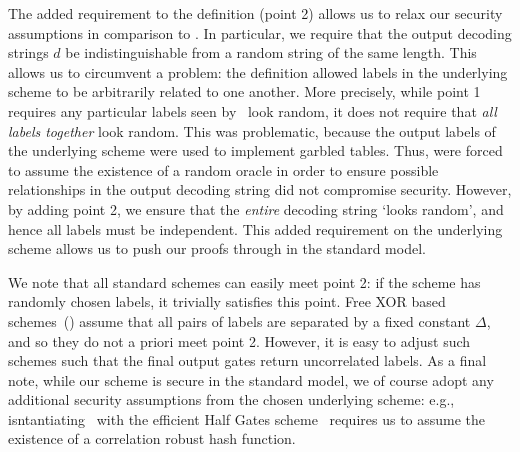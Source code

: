 The added requirement to the definition (point 2) allows us to relax
our security assumptions in comparison to \HK. In particular, we require that the output decoding
strings $d$ be indistinguishable from a random string of the same
length.  This allows us to circumvent a problem: the \HK definition allowed labels in the underlying
scheme to be arbitrarily related to one another.
More precisely, while point 1 requires any particular labels seen by
\E\ look random, it does not require that \emph{all labels together}
look random.
%
This was problematic, because the output labels of the
underlying scheme were used to implement garbled tables.
%
Thus, \HK were forced to assume the existence of a random oracle in
order to ensure possible relationships in the output decoding string
did not compromise security.
%
However, by adding point 2, we ensure that the \emph{entire} decoding
string `looks random', and hence all labels must be independent.
This added requirement on the underlying scheme allows us to push our
proofs through in the standard model.

We note that all standard schemes can easily meet point 2:
if the scheme has randomly chosen labels, it trivially satisfies this
point.
%
Free XOR based schemes~(\cite{ICALP:KolSch08}) assume that all
pairs of labels are separated by a fixed constant $\Delta$, and so
they do not a priori meet point 2. However, it is easy to adjust such
schemes such that the final output gates return uncorrelated labels.
%
As a final note, while our scheme is secure in the standard model, we
of course adopt any additional security assumptions from the chosen
underlying scheme: e.g., isntantiating \ourscheme\ with the efficient
Half Gates scheme~\cite{EPRINT:ZahRosEva14} requires us to assume the
existence of a correlation robust hash function.

